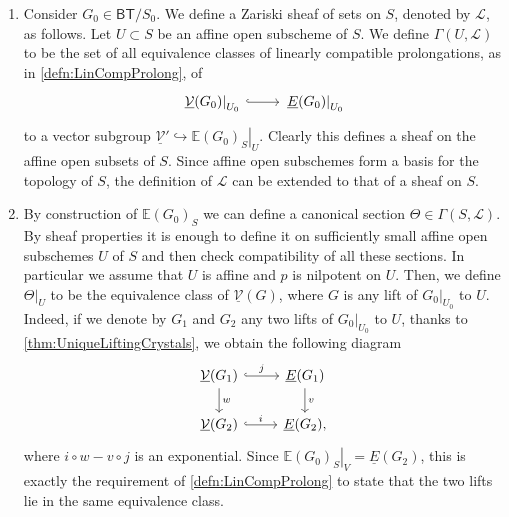 \begin{rem}[]\leavevmode\vspace{-.2\baselineskip}
\begin{enumerate}
	\item Consider $G_0 \in \mathsf{BT}/S_0$.
		We define a Zariski sheaf of sets on $S$, denoted by $\mathscr{L}$,
		as follows.
		Let $U \subset S$ be an affine open subscheme of $S$.
		We define $\Gamma(U,\mathscr{L})$ to be the set of all 
		equivalence classes of linearly compatible prolongations,
		as in \cref{defn:LinCompProlong}, of
		\begin{equation*}
		\begin{tikzcd}[row sep = 0ex
			,/tikz/column 1/.append style={anchor=base east}
			,/tikz/column 2/.append style={anchor=base west}]
			\left.\underline{\mathcal{V}}(G_0)\right|_{U_0} \arrow[r, "", hookrightarrow] &
			\left.\underline{E}(G_0)\right|_{U_0}
		\end{tikzcd}
		\end{equation*} 
		to a vector subgroup $\underline{\mathcal{V}}' \hookrightarrow 
		\left.\mathbb{E}(G_0)_S\right|_{U}$.
		Clearly this defines a sheaf on the affine open subsets of $S$.
		Since affine open subschemes form a basis for the topology of $S$, the definition
		of $\mathscr{L}$ can be extended to that of a sheaf on $S$.

	\item By construction of $\mathbb{E}(G_0)_S$ we can define a canonical
		section $\Theta \in \Gamma(S, \mathscr{L})$.
		By sheaf properties it is enough to define it on sufficiently small
		affine open subschemes $U$ of $S$ and then check compatibility of all
		these sections.
		In particular we assume that $U$ is affine and $p$ is nilpotent on $U$.
		Then, we define $\left.\Theta\right|_{ U }$ to be the equivalence class
		of $\underline{\mathcal{V}}(G)$, where $G$ is any lift of $\left.G_0\right|_{ U_0 }$
		to $U$.
		Indeed, if we denote by \(G_1\)	and \(G_2\) any two lifts of
		\(\left.G_0\right|_{ U_0 }\) to \(U\), thanks to 
		\cref{thm:UniqueLiftingCrystals},
		we obtain the following diagram
		\begin{equation*}
		\begin{tikzcd}
			\underline{\mathcal{V}}(G_1) \arrow[r, "j", hookrightarrow] 
			\arrow[d, "w", rightarrow] &
			\underline{E}(G_1) \arrow[d, "v", rightarrow] \\
			\underline{\mathcal{V}}(G_2) \arrow[r, "i", hookrightarrow] &
			\underline{E}(G_2)
		,\end{tikzcd}
		\end{equation*}
		where $i \circ w - v \circ j$ is an exponential.
		Since $\left.\mathbb{E}(G_0)_S\right|_{ V } = \underline{E}(G_2)$,
		this is exactly the requirement of \cref{defn:LinCompProlong} 
		to state that the two lifts lie in the same equivalence class.


\end{enumerate}
\end{rem}
